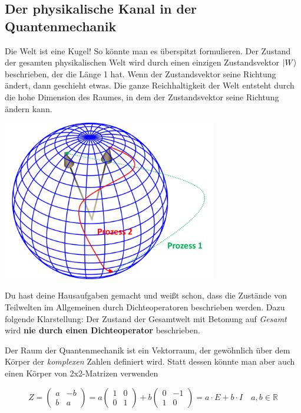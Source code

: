 \documentclass[12pt]{book}
\begin{document}
\subsection{Der physikalische Kanal in der Quantenmechanik}

Die Welt ist eine Kugel! So könnte man es überspitzt formulieren. Der Zustand der gesamten physikalischen Welt wird durch einen einzigen Zustandsvektor $\ket{W}$ beschrieben, der die Länge 1 hat. Wenn der Zustandsvektor seine Richtung ändert, dann geschieht etwas. Die ganze Reichhaltigkeit der Welt entsteht durch die hohe Dimension  des Raumes, in dem der Zustandsvektor seine Richtung ändern kann. 

\begin{center}
\includegraphics[width=0.7\textwidth]{Bilder/Prozesse.png}
\end{center}

Du hast deine Hausaufgaben gemacht und weißt schon, dass die Zustände von Teilwelten im Allgemeinen durch Dichteoperatoren beschrieben werden. Dazu folgende Klarstellung: Der Zustand der Gesamtwelt mit Betonung auf \emph{Gesamt} wird \textbf{nie durch einen Dichteoperator} beschrieben. 

Der Raum der Quantenmechanik ist ein Vektorraum, der gewöhnlich über dem Körper der \emph{komplexen} Zahlen definiert wird. Statt dessen könnte man aber auch einen Körper von 2x2-Matrizen verwenden

\begin{equation*}
Z = \begin{pmatrix}a&-b\\b&a\end{pmatrix} = a \begin{pmatrix}1&0\\0&1\end{pmatrix} + b \begin{pmatrix}0&-1\\1&0\end{pmatrix} = a \cdot E + b \cdot I \quad a,b \in \mathbb{R}
\end{equation*} 
\end{document}
